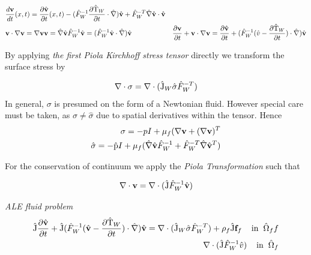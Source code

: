 \begin{align*}
&\frac{d \mathbf{v}}{dt}(x,t) = 
\frac{\partial \hat{\mathbf{v}}}{\partial t}(x,t) - (\hat{F}_W^{-1}\frac{\partial \text{\^{T}}_W}{\partial t} \cdot \hat{\nabla})\hat{\mathbf{v}}
+ \hat{F}_W^{-T}\hat{\nabla}\hat{\mathbf{v}} \cdot \hat{\mathbf{v}} \\
&\mathbf{v} \cdot \nabla \mathbf{v} = \nabla \mathbf{v} \mathbf{v} = 
\hat{\mathbf{\nabla}}\hat{\mathbf{v}}\hat{F}_W^{-1}\hat{\mathbf{v}} = (\hat{F}_W^{-1}\hat{\mathbf{v}} \cdot \hat{\nabla})\hat{\mathbf{v}} 
&\frac{\partial \mathbf{v}}{\partial t} + \mathbf{v} \cdot \nabla \mathbf{v} =
\frac{\partial \hat{\mathbf{v}}}{\partial t} + (\hat{F}_W^{-1}(\hat{v} - \frac{\partial \text{\^{T}}_W}{\partial t}) \cdot \hat{\nabla}) \hat{\mathbf{v}}
\end{align*}

By applying \textit{the first Piola Kirchhoff stress tensor} directly we transform the surface stress by 

\begin{align*}
\nabla \cdot \sigma = \nabla \cdot (\text{\^{J}}_W \hat{\sigma}\hat{F}_W^{-T})
\end{align*}
In general, $\sigma$ is presumed on the form of a Newtonian fluid.
However special care must be taken, as $\sigma \neq \hat{\sigma}$ due to spatial derivatives within the tensor. Hence 
\begin{align*}
\sigma = -p I + \mu_f(\nabla \mathbf{v} + (\nabla \mathbf{v})^T \\
\hat{\sigma} = -\text{\^{p}} I + \mu_f(\hat{\nabla}\hat{\mathbf{v}}\hat{F}_W^{-1} +\hat{F}_W^{-T}\hat{\nabla}\hat{\mathbf{v}}^T )
\end{align*} 

For the conservation of continuum we apply the \textit{Piola Transformation} \cite{Richter2016}such that

\begin{align*}
\nabla \cdot \mathbf{v} = \nabla \cdot (\text{\^{J}} \hat{F}_W^{-1} \hat{\mathbf{v}})
\end{align*}

\begin{equat}
\textit{ALE fluid problem}
\begin{align}
\text{\^{J}} \frac{\partial \hat{\mathbf{v}}}{\partial t} + \text{\^{J}} (\hat{F}_W^{-1}(\hat{\mathbf{v}} - \frac{\partial \text{\^{T}}_W}{\partial t}) \cdot \hat{\nabla}) \hat{\mathbf{v}}
= \nabla \cdot (\text{\^{J}}_W \hat{\sigma}\hat{F}_W^{-T}) + \rho_f \text{\^{J}} \mathbf{f}_f
\hspace{4mm} \text{in} \hspace{2mm} \hat{\Omega}_f f \\
\nabla \cdot (\text{\^{J}} \hat{F}_W^{-1} \hat{v}) \hspace{4mm} \text{in} \hspace{2mm} \hat{\Omega}_f 
\end{align}
\end{equat}

